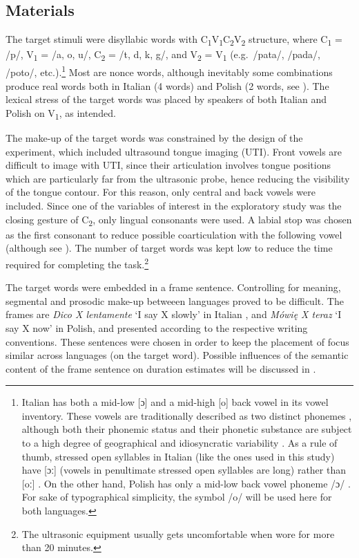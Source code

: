 \documentclass[12pt,]{article}
\let\rmarkdownfootnote\footnote%
\def\footnote{\protect\rmarkdownfootnote}
\begin{document}
\hypertarget{materials}{%
\subsection{Materials}\label{materials}}

\label{s:materials}

The target stimuli were disyllabic words with
C\textsubscript{1}V\textsubscript{1}C\textsubscript{2}V\textsubscript{2}
structure, where C\textsubscript{1} = /p/, V\textsubscript{1} = /a, o,
u/, C\textsubscript{2} = /t, d, k, g/, and V\textsubscript{2} =
V\textsubscript{1} (e.g.~/pata/, /pada/, /poto/,
etc.).\footnote{Italian has both a mid-low [ɔ] and a mid-high [o] back vowel in its vowel inventory. These vowels are traditionally described as two distinct phonemes \citep{kramer2009}, although both their phonemic status and their phonetic substance are subject to a high degree of geographical and idiosyncratic variability \citep{renwick2016}. As a rule of thumb, stressed open syllables in Italian (like the ones used in this study) have [ɔː] (vowels in penultimate stressed open syllables are long) rather than [oː] \citep{renwick2016}. On the other hand, Polish has only a mid-low back vowel phoneme /ɔ/ \citep{gussmann2007}. For sake of typographical simplicity, the symbol /o/ will be used here for both languages.}
Most are nonce words, although inevitably some combinations produce real
words both in Italian (4 words) and Polish (2 words, see
). The lexical stress of the target words was placed by
speakers of both Italian and Polish on V\textsubscript{1}, as intended.

The make-up of the target words was constrained by the design of the
experiment, which included ultrasound tongue imaging (UTI). Front vowels
are difficult to image with UTI, since their articulation involves
tongue positions which are particularly far from the ultrasonic probe,
hence reducing the visibility of the tongue contour. For this reason,
only central and back vowels were included. Since one of the variables
of interest in the exploratory study was the closing gesture of
C\textsubscript{2}, only lingual consonants were used. A labial stop was
chosen as the first consonant to reduce possible coarticulation with the
following vowel (although see \citealt{vazquez-alvarez2007}). The number
of target words was kept low to reduce the time required for completing
the
task.\footnote{The ultrasonic equipment usually gets uncomfortable when wore for more than 20 minutes.
}

The target words were embedded in a frame sentence. Controlling for
meaning, segmental and prosodic make-up betweeen languages proved to be
difficult. The frames are \emph{Dico X lentamente} `I say X slowly' in
Italian \citep[following][]{hajek2008}, and \emph{Mówię X teraz} `I say
X now' in Polish, and presented according to the respective writing
conventions. These sentences were chosen in order to keep the placement
of focus similar across languages (on the target word). Possible
influences of the semantic content of the frame sentence on duration
estimates will be discussed in .
\end{document}
